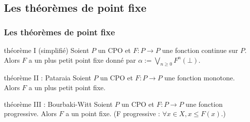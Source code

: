 \documentclass{beamer}
\begin{document}
\begin{frame}
\begin{columns}
\begin{column}{0.5\linewidth}

\end{column}
\end{columns}









\end{frame}

\subsection{Les théorèmes de point fixe}
\begin{frame}
\frametitle{Les théorèmes de point fixe}


\begin{alertblock}{théorème I (simplifié)}
Soient $P$ un CPO et $F : P \rightarrow P$ une fonction continue sur $P$. Alors $F$ a un plus petit point fixe donné par $\alpha := \bigvee_{n \geq 0}F^n(\bot)$.
\end{alertblock}

\pause
\begin{alertblock}{théorème II : Pataraia}
Soient $P$ un CPO et $F : P \rightarrow P$ une fonction monotone. Alors $F$ a un plus petit point fixe.
\end{alertblock} %

\pause
\begin{alertblock}{théorème III : Bourbaki-Witt}
Soient $P$ un CPO et $F : P \rightarrow P$ une fonction progressive. Alors $F$ a un point fixe. (F progressive : $\forall x \in X, x \leq F(x)$.) 

\end{alertblock}



\end{frame}
\end{document}
